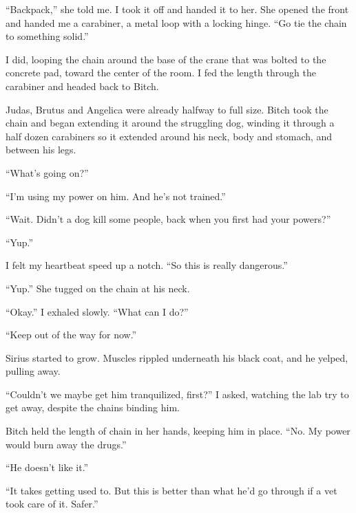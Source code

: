 ``Backpack,'' she told me.  I took it off and handed it to her.  She opened the front and handed me a carabiner, a metal loop with a locking hinge.  ``Go tie the chain to something solid.''



I did, looping the chain around the base of the crane that was bolted to the concrete pad, toward the center of the room.  I fed the length through the carabiner  and headed back to Bitch.



Judas, Brutus and Angelica were already halfway to full size.   Bitch took the chain and began extending it around the struggling dog, winding it through a half dozen carabiners so it extended around his neck, body and stomach, and between his legs.



``What's going on?''



``I'm using my power on him.  And he's not trained.''



``Wait.  Didn't a dog kill some people, back when you first had your powers?''



``Yup.''



I felt my heartbeat speed up a notch.  ``So this is really dangerous.''



``Yup.''  She tugged on the chain at his neck.



``Okay.''  I exhaled slowly.  ``What can I do?''



``Keep out of the way for now.''



Sirius started to grow.  Muscles rippled underneath his black coat, and he yelped, pulling away.



``Couldn't we maybe get him tranquilized, first?'' I asked, watching the lab try to get away, despite the chains binding him.



Bitch held the length of chain in her hands, keeping him in place.  ``No.  My power would burn away the drugs.''



``He doesn't like it.''



``It takes getting used to. But this is better than what he'd go through if a vet took care of it.  Safer.''



